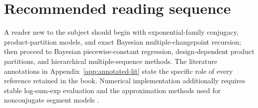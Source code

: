 \section{Recommended reading sequence}
A reader new to the subject should begin with exponential-family conjugacy, product-partition
models, and exact Bayesian multiple-changepoint recursion; then proceed to Bayesian
piecewise-constant regression, design-dependent product partitions, and hierarchical
multiple-sequence methods. The literature annotations in Appendix~\ref{app:annotated-lit} state the
specific role of every reference retained in the book. Numerical implementation additionally
requires stable log-sum-exp evaluation and the approximation methods used for nonconjugate segment
models \citep{blanchard2021lse}.
